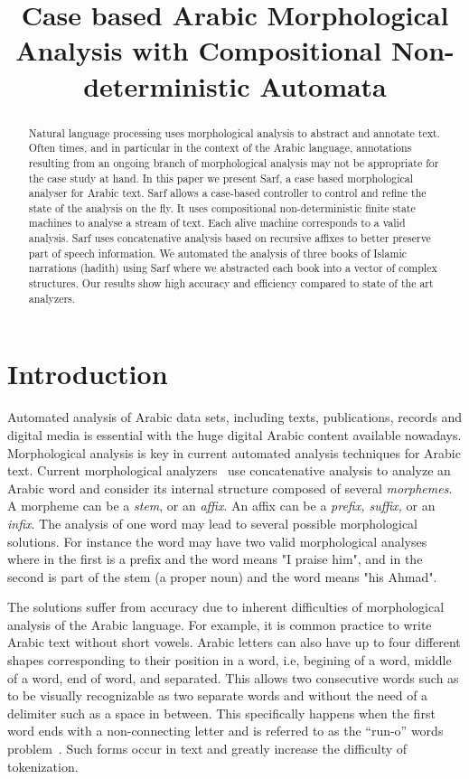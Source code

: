 \documentclass[11pt,letterpaper]{article}
\title{Case based Arabic Morphological Analysis with 
    Compositional Non-deterministic Automata }
\date{}
\begin{document}
\maketitle

\begin{abstract}
Natural language processing uses morphological 
analysis to abstract and annotate text.
Often times, and in particular in the context
of the Arabic language, annotations resulting from 
an ongoing branch of morphological analysis may not be
appropriate for the case study at hand. 
In this paper we present Sarf, a case based morphological 
analyser for Arabic text. 
Sarf allows a case-based controller to control and refine
the state of the analysis on the fly. 
It uses compositional non-deterministic finite state machines 
to analyse a stream of text. 
Each alive machine corresponds to a valid analysis. 
Sarf uses concatenative analysis based on recursive affixes 
to better preserve part of speech information.
We automated the analysis of three books of Islamic
narrations (hadith) using Sarf where we
abstracted each book into a vector of complex structures.
Our results show high accuracy and efficiency compared to
state of the art analyzers. 
\end{abstract}

\section{Introduction}

Automated analysis of Arabic data sets, including texts, 
publications, records and digital media is essential
with the huge digital Arabic content available nowadays. 
Morphological analysis is key in current automated 
analysis techniques for Arabic text. 
Current morphological analyzers~\cite{Sughaiyer:04}
use concatenative analysis
to analyze an Arabic word and
consider its internal structure composed of several
{\em morphemes}. A morpheme can be a {\em stem}, or an {\em affix}.
An affix can be a {\em prefix, suffix, } or an {\em infix}.
The analysis of one word may lead to several possible
morphological solutions.
\vocalize
For instance the word  
may have two valid morphological analyses where in the first
 is a prefix and the word means "I praise him",
and in the second  is part of the stem 
 (a proper noun)
and the word means "his Ahmad".

\novocalize
The solutions suffer from accuracy due to inherent difficulties
of morphological analysis of the Arabic language. 
For example, it is common practice to write Arabic text
without short vowels. 
Arabic letters can also have up to four different shapes 
corresponding to their position in a word, i.e, begining of 
a word, middle of a word, end of word, and separated. 
This allows two consecutive words such as 
to be visually recognizable
as two separate words  and  without 
the need of a delimiter such as a space in between. 
This specifically happens when the first word ends with
a non-connecting letter and is referred to as the ``run-o'' words
problem~\cite{Buckwalter:04}.
Such forms occur in text and greatly increase the
difficulty of tokenization.
\end{document}
